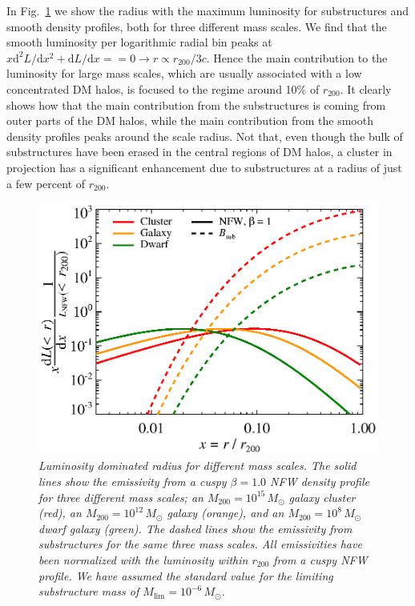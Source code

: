 \documentclass[10pt,aps,pra,reprint,amsmath,amsfonts,amssymb,showpacs]{revtex4-1}
\newcommand{\rmn}{\mathrm}
\newcommand{\msun}{M_\odot}
\newcommand{\dd}{\rmn{d}}
\newcommand{\rvir}{r_{200}}
\newcommand{\mvir}{M_{200}}
\begin{document}
In Fig.~\ref{fig:radial_emis} we show the radius with the maximum
luminosity for substructures and smooth density profiles, both for
three different mass scales. We find that the smooth luminosity per
logarithmic radial bin peaks at $x \dd^2 L/\dd x^2+\dd L/\dd x == 0
\rightarrow r \propto \rvir/3c$. Hence the main contribution to the
luminosity for large mass scales, which are usually associated with a
low concentrated DM halos, is focused to the regime around 10\% of
$\rvir$.  It clearly shows how that the main contribution from the
substructures is coming from outer parts of the DM halos, while the
main contribution from the smooth density profiles peaks around the
scale radius. Not that, even though the bulk of substructures have
been erased in the central regions of DM halos, a cluster in
projection has a significant enhancement due to substructures at a
radius of just a few percent of $\rvir$.
\begin{figure}
  \includegraphics[width=0.99\columnwidth]{figures/emissiv.sub.eps}
  \caption{\it Luminosity dominated radius for different mass
    scales. The solid lines show the emissivity from a cuspy
    $\beta=1.0$ NFW density profile for three different mass scales;
    an $\mvir=10^{15}\,\msun$ galaxy cluster (red), an
    $\mvir=10^{12}\,\msun$ galaxy (orange), and an
    $\mvir=10^{8}\,\msun$ dwarf galaxy (green). The dashed lines show
    the emissivity from substructures for the same three mass
    scales. All emissivities have been normalized with the luminosity
    within $\rvir$ from a cuspy NFW profile. We have assumed the
    standard value for the limiting substructure mass of
    $M_\rmn{lim}=10^{-6}\,\msun$.}
  \label{fig:radial_emis}
\end{figure}
\end{document}
